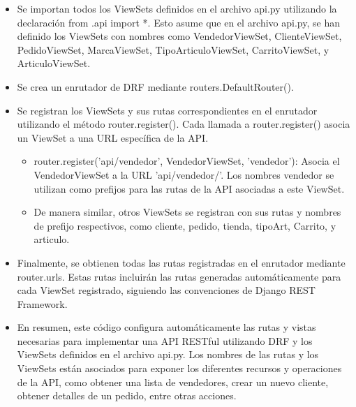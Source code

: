 \documentclass{article}
\begin{document}
    

    \begin{itemize}
        \item Se importan todos los ViewSets definidos en el archivo api.py utilizando la declaración from .api import *. Esto asume que en el archivo api.py, se han definido los ViewSets con nombres como VendedorViewSet, ClienteViewSet, PedidoViewSet, MarcaViewSet, TipoArticuloViewSet, CarritoViewSet, y ArticuloViewSet.
        \item Se crea un enrutador de DRF mediante routers.DefaultRouter().
        \item Se registran los ViewSets y sus rutas correspondientes en el enrutador utilizando el método router.register(). Cada llamada a router.register() asocia un ViewSet a una URL específica de la API.
        \begin{itemize}
            \item router.register('api/vendedor', VendedorViewSet, 'vendedor'): Asocia el VendedorViewSet a la URL 'api/vendedor/'. Los nombres vendedor se utilizan como prefijos para las rutas de la API asociadas a este ViewSet.
            \item De manera similar, otros ViewSets se registran con sus rutas y nombres de prefijo respectivos, como cliente, pedido, tienda, tipoArt, Carrito, y articulo.
        \end{itemize}
        \item Finalmente, se obtienen todas las rutas registradas en el enrutador mediante router.urls. Estas rutas incluirán las rutas generadas automáticamente para cada ViewSet registrado, siguiendo las convenciones de Django REST Framework.
        \item En resumen, este código configura automáticamente las rutas y vistas necesarias para implementar una API RESTful utilizando DRF y los ViewSets definidos en el archivo api.py. Los nombres de las rutas y los ViewSets están asociados para exponer los diferentes recursos y operaciones de la API, como obtener una lista de vendedores, crear un nuevo cliente, obtener detalles de un pedido, entre otras acciones.
    \end{itemize}
    
    
    
\end{document}
